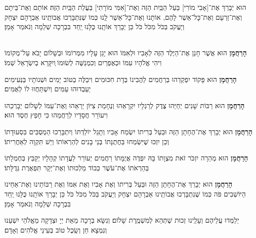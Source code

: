 \documentclass[twoside, openany, parskip=half, 11pt]{book}
\begin{document}
הוּא יְבָרֵךְ אֶת־[אָבִי מוֹרִי] בַּעַל הַבַּֽיִת הַזֶּה וְאֶת־[אִמִּי מוֹרָתִי] בַּעֲלַת הַבַּֽיִת הַזֶּה׃ אוֹתָם וְאֶת־בֵּיתָם וְאֶת־זַרְעָם וְאֶת־כׇּל־אַשֶׁר לָהֶם, אוֹתָנוּ וְאֶת־כׇּל־אַשֶׁר לָֽנוּ כְּמוֹ שֶׁנִּתְבָּרְכוּ אֲבוֹתֵֽינוּ אַבְרָהָם יִצְחָק וְיַעֲקֹב בַּכֹּל מִכֹּל כֹּל כֵּן יְבָרֵךְ אוֹתָֽנוּ כֻּלָּנוּ יַֽחַד בִּבְרָכָה שְׁלֵמָה וְנֹאמַר אָמֵן׃

\begin{sometimes}

\\
\textbf{הָרַחֲמָן}
הוּא אֲשֶׁר חָנַן אֶת־הַיֶּלֶד הַזֶּה לְאָבִיו וּלְאִמּוֹ הוּא יָגֵן עָלָיו מִמְּרוֹמוֹ וּבְשָׁלוֹם יָבֹא עַל־מְקוֹמוֹ וִיהִי אֱלֹהָיו עִמּוֹ וּכְאֶפְרַיִם וְכִמְנַשֶּׁה לְשׂוּמוֹ ְויִקָּרֵא בְיִשְׂרָאֵל שְׁמוֹ׃

\textbf{הָרַחֲמָן}
הוּא פָּקוֹד יִפְקְדֵהוּ בְּרַחֲמִים לַהֲבִינוֹ בְּדָת חִכּוּמִים וִיבַלֶּה בַטּוֹב יָמִים וּשְׁנוֹתָיו בַּנְּעִימִים יַעַבְדוּהוּ עַמִּים וְיִשְׁתַּחֲווּ לוֹ לְאֻמִּים׃

\textbf{הָרַחֲמָן}
הוּא רַבּוֹת שָׁנִים יְחַיֵּהוּ צֶדֶק לְרַגְלָיו יִקְרָאֵהוּ וְנֶחָמַת צִיּוֹן יַרְאֵהוּ וְאֶת־עַמּוֹ לְשָׁלוֹם יְבָרְכֵהוּ וִיעוֹרֵר חֲסָדָיו לְרַחֲמֵהוּ כִּי חָפֵץ חֶסֶד הוּא׃

\textbf{הָרַחֲמָן}
הוּא יְבָרֵךְ אֶת־הֶחָתָן הַזֶּה וּבַעַל בְּרִיתוֹ יִשְׂמַח אָבִיו וְתָגֵל יוֹלַדְתּוֹ וְיִתְבָּרַכוּ הַמְסֻבִּים בִּסְעוּדָתוֹ וְכֵן יִזְכּוּ שֶׁיִּשְׂמְחוּ בַּחֲתֻנָּתוֹ בְּנֵי בָנִים לְהַרְאוֹתוֹ וְיֵשׁ תִּקְוָה לְאַחֲרִיתוֹ׃

\textbf{הָרַחֲמָן}
הוּא מְהֵרָה יִזְכֹּר זֹאת מִצְוָתוֹ בָּהּ יִפְדֶה אֲיֻמָּתוֹ רַחֲמִים יְעוֹרֵר לַעֲדָתוֹ קְהָלָיו יְקַבֵּץ בְּחֶמְלָתוֹ בְּהַרְאֹתוֹ אֶת־עֹשֶׁר כְּבוֹד מַלְכוּתוֹ וְאֶת־יְקָר תִּפְאֶרֶת גְּדֻלָּתוֹ׃

\textbf{הָרַחֲמָן}
הוּא יְבָרֵךְ אֶת־הֶחָתָן הַזֶּה וּבַּעַל בְּרִיתוֹ וְאֶת אָבִיו וְאֶת אִמּוֹ וְאֶת רַבּוֹתֵינוּ וְאֶת־אַחֵינוּ הַיּוֹשְׁבִים פֹּה כְּמוֹ שֶׁנִתְבָּרְכוּ אֲבוֹתֵֽינוּ אַבְרָהָם יִצְחָק וְיַעֲקֹב בַּכֹּל מִכֹּל כֹּל כֵּן יְבָרֵךְ אוֹתָֽנוּ כֻּלָּנוּ יַֽחַד בִּבְרָכָה שְׁלֵמָה וְנֹאמַר אָמֵן׃

\end{sometimes}

יְלַמְּדוּ עֲלֵיהֶם וְעָלֵֽינוּ זְכוּת שֶׁתְּהֵא לְמִשְׁמֶֽרֶת שָׁלוֹם׃ וְנִשָּׂא בְרָכָה מֵאֵת יְיָ וּצְדָקָה מֵאֱלֹהֵי יִשְׁעֵנוּ וְנִמְצָא חֵן וְשֵֽׂכֶל טוֹב בְּעֵינֵי אֱלֹהִים וְאָדָם׃
\end{document}
